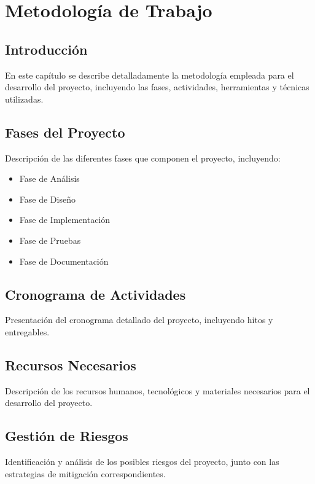 \chapter{Metodología de Trabajo}

\section{Introducción}
En este capítulo se describe detalladamente la metodología empleada para el desarrollo del proyecto, incluyendo las fases, actividades, herramientas y técnicas utilizadas.

\section{Fases del Proyecto}
Descripción de las diferentes fases que componen el proyecto, incluyendo:
\begin{itemize}
    \item Fase de Análisis
    \item Fase de Diseño
    \item Fase de Implementación
    \item Fase de Pruebas
    \item Fase de Documentación
\end{itemize}

\section{Cronograma de Actividades}
Presentación del cronograma detallado del proyecto, incluyendo hitos y entregables.

\section{Recursos Necesarios}
Descripción de los recursos humanos, tecnológicos y materiales necesarios para el desarrollo del proyecto.

\section{Gestión de Riesgos}
Identificación y análisis de los posibles riesgos del proyecto, junto con las estrategias de mitigación correspondientes.